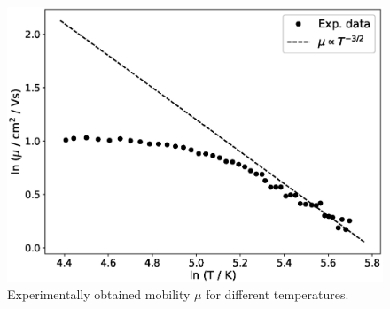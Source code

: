 \documentclass[11pt,a4paper]{article}
\begin{document}
\begin{figure}[H]
\centering
\includegraphics[width=.7\textwidth]{Hall_mobility.eps}
\caption{Experimentally obtained mobility $\mu$ for different temperatures.}
\label{fig:hall_mobility}
\end{figure}


\nocite{*}
\vfill


\end{document}
